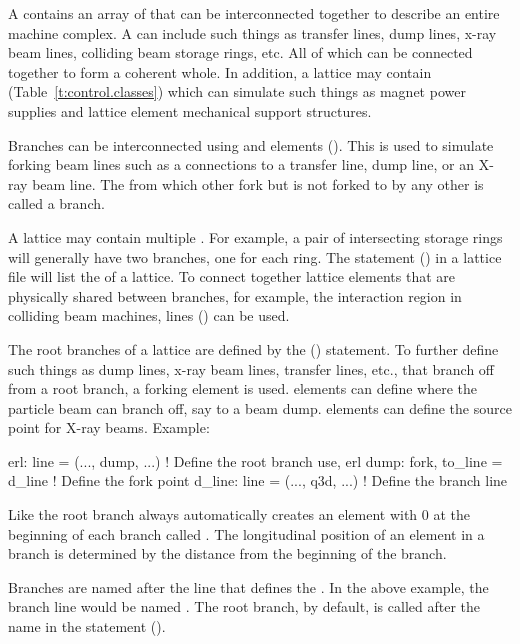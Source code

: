 A  contains an array of  that can be interconnected together to describe an entire machine
complex. A  can include such things as transfer lines, dump lines, x-ray beam lines,
colliding beam storage rings, etc. All of which can be connected together to form a coherent whole. In
addition, a lattice may contain  (Table~\ref{t:control.classes}) which can
simulate such things as magnet power supplies and lattice element mechanical support structures.

Branches can be interconnected using  and  elements (). This
is used to simulate forking beam lines such as a connections to a transfer line, dump line, or an
X-ray beam line. The  from which other  fork but is not forked to by any
other  is called a  branch.

A lattice may contain multiple  . For example, a pair of intersecting storage
rings will generally have two  branches, one for each ring. The  statement
() in a lattice file will list the   of a lattice. To connect
together lattice elements that are physically shared between branches, for example, the interaction
region in colliding beam machines,  lines () can be used.

The root branches of a lattice are defined by the  () statement. To further
define such things as dump lines, x-ray beam lines, transfer lines, etc., that branch off from a
root branch, a forking element is used.   elements can define where the particle beam can
branch off, say to a beam dump.  elements can define the source point for X-ray
beams.  Example:
\begin{example}
  erl: line = (..., dump, ...)               ! Define the root branch 
  use, erl
  dump: fork, to_line = d_line               ! Define the fork point
  d_line: line = (..., q3d, ...)             ! Define the branch line
\end{example}

Like the root branch \bmad always automatically creates an element with  0 at the
beginning of each branch called . The longitudinal  position of an element in a
branch is determined by the distance from the beginning of the branch.

Branches are named after the line that defines the . In the above example, the branch
line would be named . The root branch, by default, is called after the name in the
 statement ().
